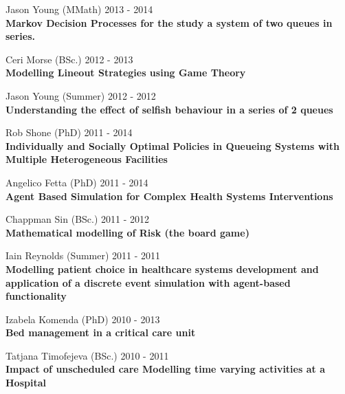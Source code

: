 \documentclass[10pt]{res} %
\begin{document}
\begin{resume}
\begin{etaremune}
\item
    Jason Young (MMath) \hfill 2013 -
    2014\\
\textbf{Markov Decision Processes for the study a system of two queues in series.}\\

\item
    Ceri Morse (BSc.) \hfill 2012 -
    2013\\
\textbf{Modelling Lineout Strategies using Game Theory}\\

\item
    Jason Young (Summer) \hfill 2012 -
    2012\\
\textbf{Understanding the effect of selfish behaviour in a series of 2 queues}\\

\item
    Rob Shone (PhD) \hfill 2011 -
    2014\\
\textbf{Individually and Socially Optimal Policies in Queueing Systems with Multiple Heterogeneous Facilities}\\

\item
    Angelico Fetta (PhD) \hfill 2011 -
    2014\\
\textbf{Agent Based Simulation for Complex Health Systems Interventions}\\

\item
    Chappman Sin (BSc.) \hfill 2011 -
    2012\\
\textbf{Mathematical modelling of Risk (the board game)}\\

\item
    Iain Reynolds (Summer) \hfill 2011 -
    2011\\
\textbf{Modelling patient choice in healthcare systems development and application of a discrete event simulation with agent-based functionality}\\

\item
    Izabela Komenda (PhD) \hfill 2010 -
    2013\\
\textbf{Bed management in a critical care unit}\\

\item
    Tatjana Timofejeva (BSc.) \hfill 2010 -
    2011\\
\textbf{Impact of unscheduled care Modelling time varying activities at a Hospital}\\


\end{etaremune}
\end{resume}
\end{document}
